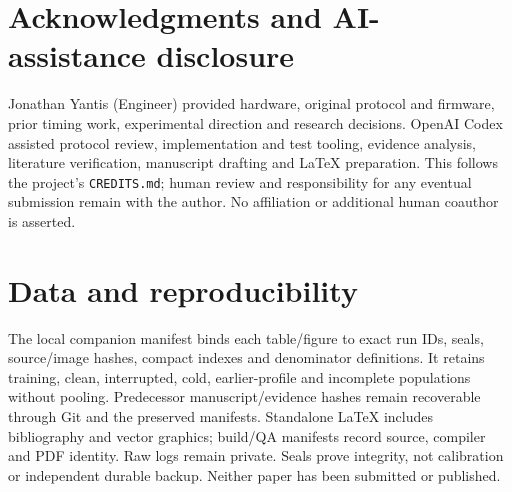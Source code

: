 \documentclass[11pt,letterpaper]{article}
\newcommand{\page}{\clearpage}
\begin{document}
\section*{Acknowledgments and AI-assistance disclosure}
Jonathan Yantis (Engineer) provided hardware, original protocol and firmware, prior timing work, experimental direction and research decisions. OpenAI Codex assisted protocol review, implementation and test tooling, evidence analysis, literature verification, manuscript drafting and LaTeX preparation. This follows the project's \texttt{CREDITS.md}; human review and responsibility for any eventual submission remain with the author. No affiliation or additional human coauthor is asserted.

\section*{Data and reproducibility}
The local companion manifest binds each table/figure to exact run IDs, seals, source/image hashes, compact indexes and denominator definitions. It retains training, clean, interrupted, cold, earlier-profile and incomplete populations without pooling. Predecessor manuscript/evidence hashes remain recoverable through Git and the preserved manifests. Standalone LaTeX includes bibliography and vector graphics; build/QA manifests record source, compiler and PDF identity. Raw logs remain private. Seals prove integrity, not calibration or independent durable backup. Neither paper has been submitted or published.
\page
\end{document}
